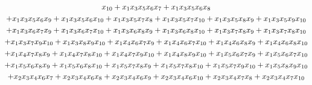 \documentclass[12pt,a4paper]{article}
\theoremstyle{plain}
\theoremstyle{remark}
\newcommand{\feynpar}{x}
\begin{document}
\begin{multline}
    \feynpar_{10}+\feynpar_{1} \feynpar_{3} \feynpar_{5} \feynpar_{6} \feynpar_{7}+\feynpar_{1} \feynpar_{3} \feynpar_{5} \feynpar_{6}
    \feynpar_{8}\cr
    +\feynpar_{1} \feynpar_{3} \feynpar_{5} \feynpar_{6} \feynpar_{9}+\feynpar_{1} \feynpar_{3} \feynpar_{5} \feynpar_{6}
    \feynpar_{10}+\feynpar_{1} \feynpar_{3} \feynpar_{5} \feynpar_{7} \feynpar_{8}+\feynpar_{1} \feynpar_{3} \feynpar_{5} \feynpar_{7}
    \feynpar_{10}+\feynpar_{1} \feynpar_{3} \feynpar_{5} \feynpar_{8} \feynpar_{9}+\feynpar_{1} \feynpar_{3} \feynpar_{5} \feynpar_{9}
    \feynpar_{10}\cr
    +\feynpar_{1} \feynpar_{3} \feynpar_{6} \feynpar_{7} \feynpar_{9}+\feynpar_{1} \feynpar_{3} \feynpar_{6} \feynpar_{7}
    \feynpar_{10}+\feynpar_{1} \feynpar_{3} \feynpar_{6} \feynpar_{8} \feynpar_{9}+\feynpar_{1} \feynpar_{3} \feynpar_{6} \feynpar_{8}
    \feynpar_{10}+\feynpar_{1} \feynpar_{3} \feynpar_{7} \feynpar_{8} \feynpar_{9}+\feynpar_{1} \feynpar_{3} \feynpar_{7} \feynpar_{8}
    \feynpar_{10}\cr
    +\feynpar_{1} \feynpar_{3} \feynpar_{7} \feynpar_{9} \feynpar_{10}+\feynpar_{1} \feynpar_{3} \feynpar_{8} \feynpar_{9}
    \feynpar_{10}+\feynpar_{1} \feynpar_{4} \feynpar_{6} \feynpar_{7} \feynpar_{9}+\feynpar_{1} \feynpar_{4} \feynpar_{6} \feynpar_{7}
    \feynpar_{10}+\feynpar_{1} \feynpar_{4} \feynpar_{6} \feynpar_{8} \feynpar_{9}+\feynpar_{1} \feynpar_{4} \feynpar_{6} \feynpar_{8}
    \feynpar_{10}\cr
    +\feynpar_{1} \feynpar_{4} \feynpar_{7} \feynpar_{8} \feynpar_{9}+\feynpar_{1} \feynpar_{4} \feynpar_{7} \feynpar_{8}
    \feynpar_{10}+\feynpar_{1} \feynpar_{4} \feynpar_{7} \feynpar_{9} \feynpar_{10}+\feynpar_{1} \feynpar_{4} \feynpar_{8} \feynpar_{9}
    \feynpar_{10}+\feynpar_{1} \feynpar_{5} \feynpar_{6} \feynpar_{7} \feynpar_{9}+\feynpar_{1} \feynpar_{5} \feynpar_{6} \feynpar_{7}
    \feynpar_{10}\cr
    +\feynpar_{1} \feynpar_{5} \feynpar_{6} \feynpar_{8} \feynpar_{9}+\feynpar_{1} \feynpar_{5} \feynpar_{6} \feynpar_{8}
    \feynpar_{10}+\feynpar_{1} \feynpar_{5} \feynpar_{7} \feynpar_{8} \feynpar_{9}+\feynpar_{1} \feynpar_{5} \feynpar_{7} \feynpar_{8}
    \feynpar_{10}+\feynpar_{1} \feynpar_{5} \feynpar_{7} \feynpar_{9} \feynpar_{10}+\feynpar_{1} \feynpar_{5} \feynpar_{8} \feynpar_{9}
    \feynpar_{10}\cr
    +\feynpar_{2} \feynpar_{3} \feynpar_{4} \feynpar_{6} \feynpar_{7}+\feynpar_{2} \feynpar_{3} \feynpar_{4} \feynpar_{6} \feynpar_{8}+\feynpar_{2}
    \feynpar_{3} \feynpar_{4} \feynpar_{6} \feynpar_{9}+\feynpar_{2} \feynpar_{3} \feynpar_{4} \feynpar_{6} \feynpar_{10}+\feynpar_{2} \feynpar_{3}
    \feynpar_{4} \feynpar_{7} \feynpar_{8}+\feynpar_{2} \feynpar_{3} \feynpar_{4} \feynpar_{7} \feynpar_{10}\cr

\end{multline}
\end{document}
